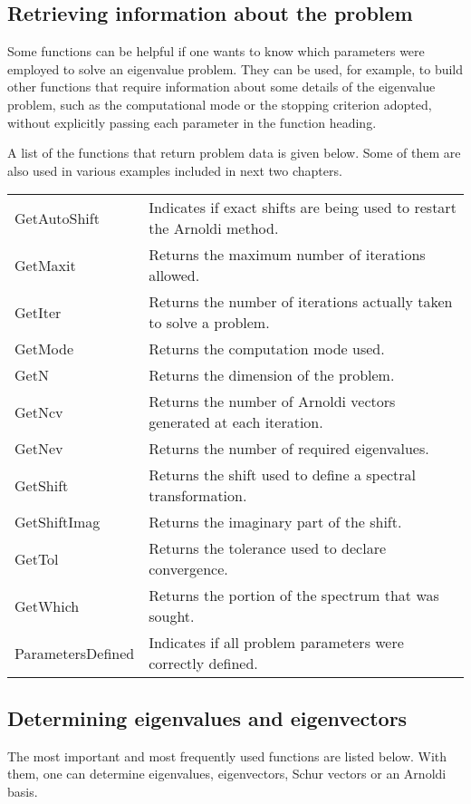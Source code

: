 \subsection{Retrieving information about the problem}

Some \ARPP{} functions can be helpful if one wants to know which parameters were employed to solve an eigenvalue problem. They can be used, for example, to build other functions that require information about some details of the eigenvalue problem, such as the computational mode or the stopping criterion adopted, without explicitly passing each parameter in the function heading.

A list of the \ARPP{} functions that return problem data is given below. Some of them are also used in various examples included in next two chapters.

\begin{tabularx}{\textwidth}{LX}
	GetAutoShift & Indicates if exact shifts are being used to restart the Arnoldi method.\\
	GetMaxit & Returns the maximum number of iterations allowed.\\
	GetIter & Returns the number of iterations actually taken to solve a problem.\\
	GetMode & Returns the computation mode used.\\
	GetN & Returns the dimension of the problem.\\
	GetNcv & Returns the number of Arnoldi vectors generated at each iteration.\\
	GetNev & Returns the number of required eigenvalues.\\
	GetShift & Returns the shift used to define a spectral transformation.\\
	GetShiftImag & Returns the imaginary part of the shift.\\
	GetTol & Returns the tolerance used to declare convergence.\\
	GetWhich & Returns the portion of the spectrum that was sought.\\
	ParametersDefined & Indicates if all problem parameters were correctly defined.\\
\end{tabularx}

\subsection{Determining eigenvalues and eigenvectors}

The most important and most frequently used \ARPP{} functions are listed below. With them, one can determine eigenvalues, eigenvectors, Schur vectors or an Arnoldi basis.

